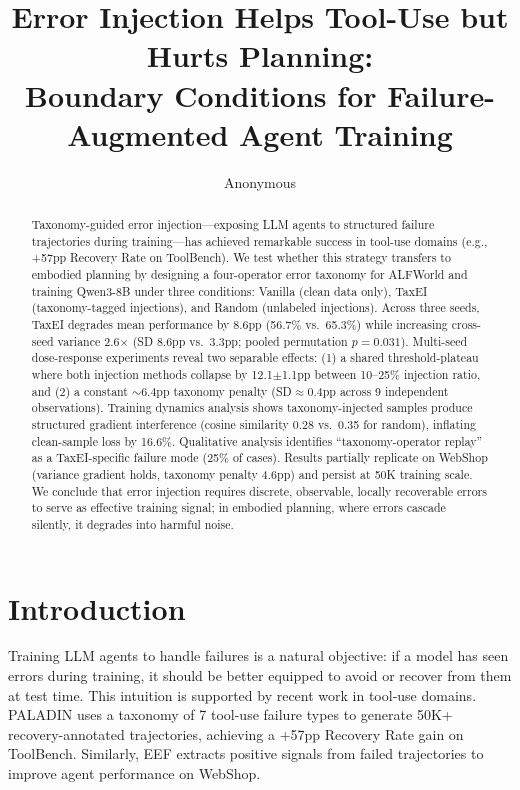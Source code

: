 \documentclass[11pt,a4paper]{article}
\title{Error Injection Helps Tool-Use but Hurts Planning:\\Boundary Conditions for Failure-Augmented Agent Training}
\author{Anonymous}
\begin{document}
\maketitle

\begin{abstract}
Taxonomy-guided error injection---exposing LLM agents to structured failure trajectories during training---has achieved remarkable success in tool-use domains (e.g., +57pp Recovery Rate on ToolBench). We test whether this strategy transfers to embodied planning by designing a four-operator error taxonomy for ALFWorld and training Qwen3-8B under three conditions: Vanilla (clean data only), TaxEI (taxonomy-tagged injections), and Random (unlabeled injections). Across three seeds, TaxEI degrades mean performance by 8.6pp (56.7\% vs.\ 65.3\%) while increasing cross-seed variance 2.6$\times$ (SD 8.6pp vs.\ 3.3pp; pooled permutation $p{=}0.031$). Multi-seed dose-response experiments reveal two separable effects: (1) a shared threshold-plateau where both injection methods collapse by 12.1$\pm$1.1pp between 10--25\% injection ratio, and (2) a constant ${\sim}6.4$pp taxonomy penalty (SD${\approx}$0.4pp across 9 independent observations). Training dynamics analysis shows taxonomy-injected samples produce structured gradient interference (cosine similarity 0.28 vs.\ 0.35 for random), inflating clean-sample loss by 16.6\%. Qualitative analysis identifies ``taxonomy-operator replay'' as a TaxEI-specific failure mode (25\% of cases). Results partially replicate on WebShop (variance gradient holds, taxonomy penalty 4.6pp) and persist at 50K training scale. We conclude that error injection requires discrete, observable, locally recoverable errors to serve as effective training signal; in embodied planning, where errors cascade silently, it degrades into harmful noise.
\end{abstract}

\section{Introduction}

Training LLM agents to handle failures is a natural objective: if a model has seen errors during training, it should be better equipped to avoid or recover from them at test time. This intuition is supported by recent work in tool-use domains. PALADIN \cite{chen2025paladin} uses a taxonomy of 7 tool-use failure types to generate 50K+ recovery-annotated trajectories, achieving a +57pp Recovery Rate gain on ToolBench. Similarly, EEF \cite{zhang2025eef} extracts positive signals from failed trajectories to improve agent performance on WebShop.
\end{document}
